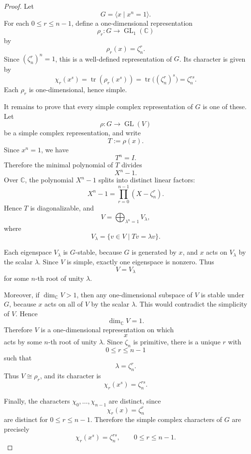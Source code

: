     \begin{proof}
        Let
        \[
            G=\langle x\mid x^n=1\rangle.
        \]
        For each \(0\leq r\leq n-1\), define a one-dimensional representation
        \[
            \rho_r:G\longrightarrow \operatorname{GL}_1(\mathbb{C})
        \]
        by
        \[
            \rho_r(x)=\zeta_n^r.
        \]
        Since \((\zeta_n^r)^n=1\), this is a well-defined representation of \(G\). Its character
        is given by
        \[
            \chi_r(x^s)
            =
            \operatorname{tr}(\rho_r(x^s))
            =
            \operatorname{tr}\bigl((\zeta_n^r)^s\bigr)
            =
            \zeta_n^{rs}.
        \]
        Each \(\rho_r\) is one-dimensional, hence simple.
        
        It remains to prove that every simple complex representation of \(G\) is one of these.
        Let
        \[
            \rho:G\longrightarrow \operatorname{GL}(V)
        \]
        be a simple complex representation, and write
        \[
            T:=\rho(x).
        \]
        Since \(x^n=1\), we have
        \[
            T^n=I.
        \]
        Therefore the minimal polynomial of \(T\) divides
        \[
            X^n-1.
        \]
        Over \(\mathbb{C}\), the polynomial \(X^n-1\) splits into distinct linear factors:
        \[
            X^n-1=\prod_{r=0}^{n-1}(X-\zeta_n^r).
        \]
        Hence \(T\) is diagonalizable, and
        \[
            V=\bigoplus_{\lambda^n=1} V_\lambda,
        \]
        where
        \[
            V_\lambda=\{v\in V\mid T v=\lambda v\}.
        \]
        
        Each eigenspace \(V_\lambda\) is \(G\)-stable, because \(G\) is generated by \(x\), and
        \(x\) acts on \(V_\lambda\) by the scalar \(\lambda\). Since \(V\) is simple, exactly one
        eigenspace is nonzero. Thus
        \[
            V=V_\lambda
        \]
        for some \(n\)-th root of unity \(\lambda\).
        
        Moreover, if \(\dim_{\mathbb{C}}V>1\), then any one-dimensional subspace of \(V\) is
        stable under \(G\), because \(x\) acts on all of \(V\) by the scalar \(\lambda\). This would
        contradict the simplicity of \(V\). Hence
        \[
            \dim_{\mathbb{C}}V=1.
        \]
        Therefore \(V\) is a one-dimensional representation on which
        \[
            x
        \]
        acts by some \(n\)-th root of unity \(\lambda\). Since \(\zeta_n\) is primitive, there is a
        unique \(r\) with
        \[
            0\leq r\leq n-1
        \]
        such that
        \[
            \lambda=\zeta_n^r.
        \]
        Thus \(V\cong \rho_r\), and its character is
        \[
            \chi_r(x^s)=\zeta_n^{rs}.
        \]
        
        Finally, the characters \(\chi_0,\ldots,\chi_{n-1}\) are distinct, since
        \[
            \chi_r(x)=\zeta_n^r
        \]
        are distinct for \(0\leq r\leq n-1\). Therefore the simple complex characters of \(G\)
        are precisely
        \[
            \chi_r(x^s)=\zeta_n^{rs},
            \qquad 0\leq r\leq n-1.
        \]
        \end{proof}